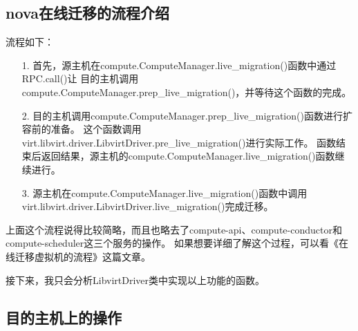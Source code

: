 \documentclass[a4paper,left=1.5cm,right=1.5cm,11pt]{article}
\begin{document}
\subsection{nova在线迁移的流程介绍}
	流程如下：
	\begin{itemize}
		\item[1.] 首先，源主机在compute.ComputeManager.live\_migration()函数中通过RPC.call()让
				  目的主机调用compute.ComputeManager.prep\_live\_migration()，并等待这个函数的完成。
		\item[2.] 目的主机调用compute.ComputeManager.prep\_live\_migration()函数进行扩容前的准备。
			      这个函数调用virt.libvirt.driver.LibvirtDriver.pre\_live\_migration()进行实际工作。
				  函数结束后返回结果，源主机的compute.ComputeManager.live\_migration()函数继续进行。
		\item[3.] 源主机在compute.ComputeManager.live\_migration()函数中调用virt.libvirt.driver.LibvirtDriver.live\_migration()完成迁移。
	\end{itemize}

	上面这个流程说得比较简略，而且也略去了compute-api、compute-conductor和compute-scheduler这三个服务的操作。
	如果想要详细了解这个过程，可以看《在线迁移虚拟机的流程》这篇文章。\par

	接下来，我只会分析LibvirtDriver类中实现以上功能的函数。

\subsection{目的主机上的操作}
\end{document}
